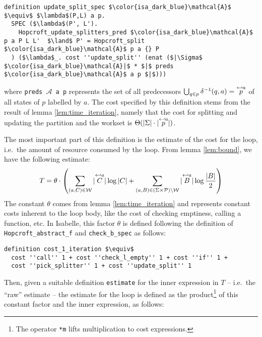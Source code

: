 \documentclass[12pt, a4 paper]{article}
\theoremstyle{definition}
\begin{document}
\begin{lstlisting}[language=Isabelle]
definition update_split_spec $\color{isa_dark_blue}\mathcal{A}$ $\equiv$ $\lambda$(P,L) a p.
  SPEC ($\lambda$(P', L').
    Hopcroft_update_splitters_pred $\color{isa_dark_blue}\mathcal{A}$ p a P L L'  $\land$ P' = Hopcroft_split $\color{isa_dark_blue}\mathcal{A}$ p a {} P
  ) ($\lambda$_. cost ''update_split'' (enat ($|\Sigma$ $\color{isa_dark_blue}\mathcal{A}|$ * $|$ preds $\color{isa_dark_blue}\mathcal{A}$ a p $|$)))
\end{lstlisting}
where \texttt{preds $\mathcal{A}$ a p} represents the set of all predecessors $\bigcup_{q \in p} \delta^{-1}(q, a) = \overset{\hookleftarrow {a}}{p}$ of all states of $p$ labelled by $a$. The cost specified by this definition stems from the result of lemma \ref{lem:time_iteration}, namely that the cost for splitting and updating the partition and the workset is $\Theta(|\Sigma| \cdot |\overset{\hookleftarrow {a}}{p}|)$.

\bigskip

The most important part of this definition is the estimate of the cost for the loop, i.e.\ the amount of resource consumed by the loop. From lemma \ref{lem:bound}, we have the following estimate:
\begin{equation*}
    T = \theta \cdot \left(\sum_{(a, C) \in \mathcal{W}} | \overset{\hookleftarrow {a}}{C} | \log | C | + \sum_{(a, B) \in (\Sigma\times \mathcal{P})\setminus \mathcal{W}} | \overset{\hookleftarrow {a}}{B} | \log \frac{| B |}{2} \right)
\end{equation*}
The constant $\theta$ comes from lemma \ref{lem:time_iteration} and represents constant costs inherent to the loop body, like the cost of checking emptiness, calling a function, etc. In Isabelle, this factor $\theta$ is defined following the definition of \texttt{Hopcroft\_abstract\_f} and \texttt{check\_b\_spec} as follows:

\begin{lstlisting}[language=Isabelle]
definition cost_1_iteration $\equiv$ 
  cost ''call'' 1 + cost ''check_l_empty'' 1 + cost ''if'' 1 +
  cost ''pick_splitter'' 1 + cost ''update_split'' 1
\end{lstlisting}

Then, given a suitable definition \texttt{estimate} for the inner expression in $T$ -- i.e.\ the ``raw'' estimate -- the estimate for the loop is defined as the product\footnote{The operator \texttt{{\color{isa_blue}*m}} lifts multiplication to cost expressions.} of this constant factor and the inner expression, as follows:
\end{document}
